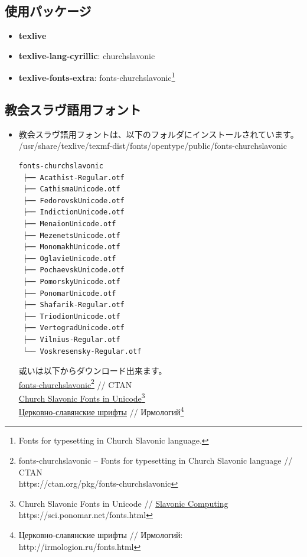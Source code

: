 \documentclass[a4paper,12pt]{ltjsarticle}
\def\colH#1{\color[HTML]{#1}}
\begin{document}
\subsection{使用パッケージ}
\vspace{-2mm}
\begin{itemize}
  \item[] \textbf{texlive}
  \item[] \textbf{texlive-lang-cyrillic}: churchslavonic  
  \item[] \textbf{texlive-fonts-extra}: fonts-churchslavonic\footnote{Fonts for typesetting in Church Slavonic language.}
\end{itemize}
\vspace{-6mm}

\subsection{教会スラヴ語用フォント}
\vspace{-2mm}
\begin{itemize}
  \item 教会スラヴ語用フォントは、以下のフォルダにインストールされています。\\
  /usr/share/texlive/texmf-dist/fonts/opentype/public/{\colH{800000}fonts-churchslavonic}
\begin{spacing}{0.58}
\begin{verbatim}
fonts-churchslavonic
 ├── Acathist-Regular.otf
 ├── CathismaUnicode.otf
 ├── FedorovskUnicode.otf
 ├── IndictionUnicode.otf
 ├── MenaionUnicode.otf
 ├── MezenetsUnicode.otf
 ├── MonomakhUnicode.otf
 ├── OglavieUnicode.otf
 ├── PochaevskUnicode.otf
 ├── PomorskyUnicode.otf
 ├── PonomarUnicode.otf
 ├── Shafarik-Regular.otf
 ├── TriodionUnicode.otf
 ├── VertogradUnicode.otf
 ├── Vilnius-Regular.otf
 └── Voskresensky-Regular.otf
\end{verbatim}
\end{spacing}
或いは以下からダウンロード出来ます。\\
\href{https://ctan.org/pkg/fonts-churchslavonic}{fonts-churchslavonic\footnote{fonts-churchslavonic – Fonts for typesetting in Church Slavonic language // CTAN\\https://ctan.org/pkg/fonts-churchslavonic}} // CTAN\\
\href{https://sci.ponomar.net/fonts.html}{Church Slavonic Fonts in Unicode}\footnote{Church Slavonic Fonts in Unicode // \href{https://sci.ponomar.net/}{Slavo­nic Compu­ting}\\https://sci.ponomar.net/fonts.html}\\
\href{http://irmologion.ru/fonts.html}{Церковно-славянские шрифты} // Ирмологий\footnote{Церковно-славянские шрифты // Ирмологий: http://irmologion.ru/fonts.html}
\end{itemize}
\vspace{-6mm}
\end{document}
